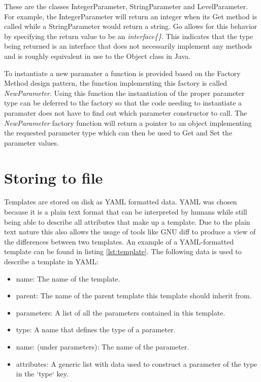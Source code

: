 These are the classes IntegerParameter, StringParameter and LevelParameter.
For example, the IntegerParameter will return an integer when its Get method is called while a StringParameter would return a string.
Go allows for this behavior by specifying the return value to be an \textit{interface\{\}}.
This indicates that the type being returned is an interface that does not necessarily implement any methods and is roughly equivalent in use to the Object class in Java.

To instantiate a new paramater a function is provided based on the Factory Method design pattern, the function implementing this factory is called \textit{NewParameter}.
Using this function the instantiation of the proper parameter type can be deferred to the factory so that the code needing to instantiate a paramater does not have to find out which parameter constructor to call.
The \textit{NewParameter} factory function will return a pointer to an object implementing the requested parameter type which can then be used to Get and Set the parameter values.

\section{Storing to file}
Templates are stored on disk as YAML formatted data. YAML was chosen because it is a plain text format that can be interpreted by humans while still being able to describe all attributes that make up a template. 
Due to the plain text nature this also allows the usage of tools like GNU diff to produce a view of the differences between two templates.
An example of a YAML-formatted template can be found in listing \ref{lst:template}.
The following data is used to describe a template in YAML:
\begin{itemize}
	\item name: The name of the template.
	\item parent: The name of the parent template this template should inherit from.
	\item parameters: A list of all the parameters contained in this template.
	\item type: A name that defines the type of a parameter.
	\item name: (under parameters): The name of the parameter.
	\item attributes: A generic list with data used to construct a parameter of the type in the `type` key.
\end{itemize}


